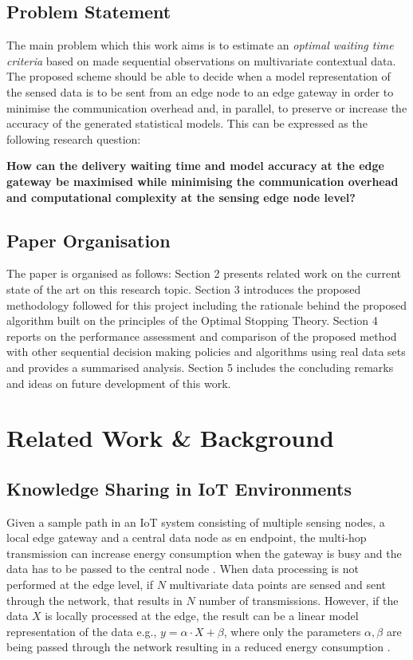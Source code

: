 \documentclass{mpaper}
\begin{document}
\subsection*{Problem Statement}
The main problem which this work aims is to estimate an \textit{optimal waiting time criteria} based on made sequential observations on multivariate contextual data. The proposed scheme should be able to decide when a model representation of the sensed data is to be sent from an edge node to an edge gateway in order to minimise the communication overhead and, in parallel, to preserve or increase the accuracy of the generated statistical models. This can be expressed as the following research question:

\textbf{How can the delivery waiting time and model accuracy at the edge gateway be maximised while minimising the communication overhead and computational complexity at the sensing edge node level?}

\subsection*{Paper Organisation}
The paper is organised as follows: Section 2 presents related work on the current state of the art on this research topic. Section 3 introduces the proposed methodology followed for this project including the rationale behind the proposed algorithm built on the principles of the Optimal Stopping Theory. Section 4 reports on the performance assessment and comparison of the proposed method with other sequential decision making policies and algorithms using real data sets and provides a summarised analysis. Section 5 includes the concluding remarks and ideas on future development of this work.

\section{Related Work \& Background}
\subsection{Knowledge Sharing in IoT Environments}
Given a sample path in an IoT system consisting of multiple sensing nodes, 
a local edge gateway and a central data node as en endpoint, 
the multi-hop transmission can increase energy consumption when the gateway is busy and the data has to be passed to the central node \cite{shi2016}. 
When data processing is not performed at the edge level, 
if $N$ multivariate data points are sensed and sent through the network, 
that results in $N$ number of transmissions. However, 
if the data $X$ is locally processed at the edge, the result 
can be a linear model representation of the data e.g., $y = \alpha \cdot X + \beta$, 
where only the parameters $\alpha, \beta$ are being passed through the network resulting in a reduced energy consumption \cite{tanluizhang2011}.
\end{document}
